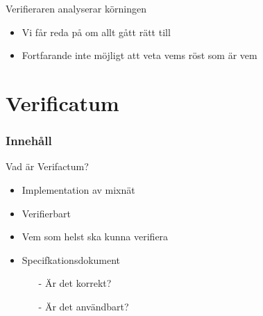 \begin{frame}{Verifieraren analyserar körningen}

\begin{center}
\end{center}

\begin{itemize}
\item Vi får reda på om allt gått rätt till
\item Fortfarande inte möjligt att veta vems röst som är vem
\end{itemize}

\end{frame}

\section{Verificatum}
\begin{frame}
\frametitle{Innehåll}
\tableofcontents[currentsection]
\end{frame}

\begin{frame}{Vad är Verifactum?}

\begin{itemize}
\item Implementation av mixnät
\item Verifierbart
\item Vem som helst ska kunna verifiera
\item Specifkationsdokument
\begin{itemize}
	\item[-] Är det korrekt?
	\item[-] Är det användbart?
\end{itemize}
\end{itemize}

\end{frame}
